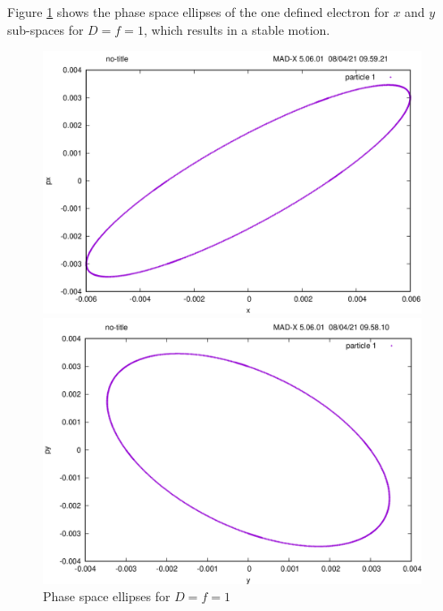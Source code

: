 Figure \ref{fig:ellipse} shows the phase space ellipses of the one defined electron for $x$ and $y$ sub-spaces for $D=f=1$, which results in a stable motion.

\begin{figure}
    \centering
    \begin{minipage}{0.49\textwidth}
        \includegraphics[width=\textwidth]{../../part1/d1f1_x.png}
    \end{minipage}\hfill
    \begin{minipage}{0.49\textwidth}
        \centering
        \includegraphics[width=\textwidth]{../../part1/d1f1_y.png}
    \end{minipage}
    \caption{Phase space ellipses for $D=f=1$}
    \label{fig:ellipse}
\end{figure}

